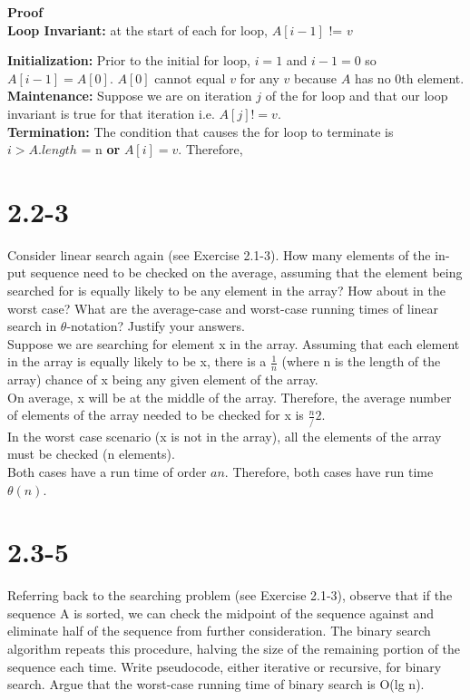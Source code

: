 \documentclass{article}
\begin{document}
\noindent
{\bfseries{\large Proof}}\\

\noindent
\textbf{Loop Invariant:} at the start of each for loop, $A[i-1]$ != $v$ \\
{\textbf{Initialization: } Prior to the initial for loop, $i = 1$ and $i - 1 = 0$
  so $A[i-1] = A[0]$. $A[0]$ cannot equal $v$ for any $v$ because $A$ has no 0th element.\\
\textbf{Maintenance: } Suppose we are on iteration $j$ of the for loop and that our loop
invariant is true for that iteration i.e. $A[j] != v$. \\
\textbf{Termination: } The condition that causes the for loop to terminate is
$i > A.length$ = n \textbf{or} $A[i] = v$. Therefore,

\section{2.2-3}
Consider linear search again (see Exercise 2.1-3). How many elements of the in-
put sequence need to be checked on the average, assuming that the element being
searched for is equally likely to be any element in the array? How about in the
worst case? What are the average-case and worst-case running times of linear
search in $\theta$-notation? Justify your answers. \\

\noindent
Suppose we are searching for element x in the array.
Assuming that each element in the array is equally likely to be x,
there is a $\frac{1}{n}$ (where n is the length of the array) chance
of x being any given element of the array. \\

\noindent
On average, x will be at the middle of the array.
Therefore, the average number of elements of the array needed to be
checked for x is $\frac{n}/{2}$. \\

\noindent
In the worst case scenario (x is not in the array), all the elements of
the array must be checked (n elements). \\

\noindent
Both cases have a run time of order $an$. Therefore, both cases have run time
$\theta(n)$.

\section{2.3-5}
Referring back to the searching problem (see Exercise 2.1-3), observe
that if the sequence A is sorted, we can check the midpoint of the
sequence against and eliminate half of the sequence from further
consideration. The binary search algorithm repeats this procedure,
halving the size of the remaining portion of the sequence each time.
Write pseudocode, either iterative or recursive, for binary search. Argue
that the worst-case running time of binary search is O(lg n).

}
\end{document}
